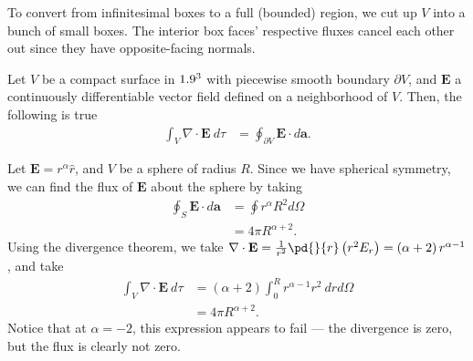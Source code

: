 \documentclass[10pt]{mypackage}
\begin{document}
To convert from infinitesimal boxes to a full (bounded) region, we cut up $V$ into a bunch of small boxes. The interior box faces' respective fluxes cancel each other out since they have opposite-facing normals.
\begin{theorem}
    Let $V$ be a compact surface in $1.9^3$ with piecewise smooth boundary $\partial V$, and $\mathbf{E}$ a continuously differentiable vector field defined on a neighborhood of $V$. Then, the following is true
  \begin{align*}
    \int_{V}^{} \nabla \cdot \mathbf{E}\:d\tau &= \oint_{\partial V}^{} \mathbf{E}\cdot d\mathbf{a}.
  \end{align*}
\end{theorem}
\begin{example}
  Let $\mathbf{E} = r^{\alpha}\hat{r}$, and $V$ be a sphere of radius $R$. Since we have spherical symmetry, we can find the flux of $\mathbf{E}$ about the sphere by taking
  \begin{align*}
    \oint_{S}\mathbf{E}\cdot d\mathbf{a} &= \oint r^{\alpha}R^2d\Omega\\
                                         &= 4\pi R^{\alpha + 2}.
  \end{align*}
  Using the divergence theorem, we take $\nabla \cdot \mathbf{E} = \frac{1}{r^2}\pd{}{r}\left(r^2E_{r}\right) = \left(\alpha + 2\right)r^{\alpha - 1}$, and take
  \begin{align*}
    \int_{V}^{} \nabla \cdot \mathbf{E}\:d\tau &= \left(\alpha + 2\right)\int_{0}^{R} r^{\alpha - 1}r^{2}\:drd\Omega\\
                                               &= 4\pi R^{\alpha + 2}.
  \end{align*}
  Notice that at $\alpha = -2$, this expression appears to fail --- the divergence is zero, but the flux is clearly not zero.
\end{example}
\end{document}
